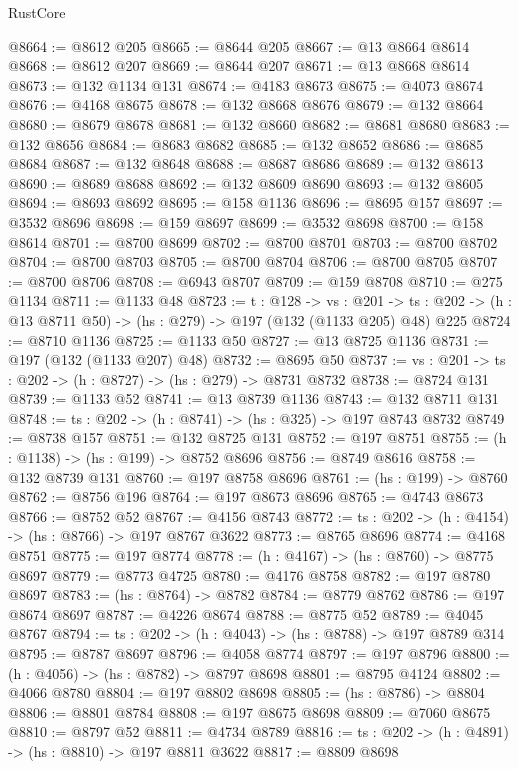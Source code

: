 \begin{lexlean}{RustCore}
\begin{coremodule}
@8664 := @8612 @205
@8665 := @8644 @205
@8667 := @13 @8664 @8614
@8668 := @8612 @207
@8669 := @8644 @207
@8671 := @13 @8668 @8614
@8673 := @132 @1134 @131
@8674 := @4183 @8673
@8675 := @4073 @8674
@8676 := @4168 @8675
@8678 := @132 @8668 @8676
@8679 := @132 @8664
@8680 := @8679 @8678
@8681 := @132 @8660
@8682 := @8681 @8680
@8683 := @132 @8656
@8684 := @8683 @8682
@8685 := @132 @8652
@8686 := @8685 @8684
@8687 := @132 @8648
@8688 := @8687 @8686
@8689 := @132 @8613
@8690 := @8689 @8688
@8692 := @132 @8609 @8690
@8693 := @132 @8605
@8694 := @8693 @8692
@8695 := @158 @1136
@8696 := @8695 @157
@8697 := @3532 @8696
@8698 := @159 @8697
@8699 := @3532 @8698
@8700 := @158 @8614
@8701 := @8700 @8699
@8702 := @8700 @8701
@8703 := @8700 @8702
@8704 := @8700 @8703
@8705 := @8700 @8704
@8706 := @8700 @8705
@8707 := @8700 @8706
@8708 := @6943 @8707
@8709 := @159 @8708
@8710 := @275 @1134
@8711 := @1133 @48
@8723 := {t : @128} ->
  {vs : @201} ->
  {ts : @202} -> (h : @13 @8711 @50) -> (hs : @279) -> @197 (@132 (@1133 @205) @48) @225
@8724 := @8710 @1136
@8725 := @1133 @50
@8727 := @13 @8725 @1136
@8731 := @197 (@132 (@1133 @207) @48)
@8732 := @8695 @50
@8737 := {vs : @201} -> {ts : @202} -> (h : @8727) -> (hs : @279) -> @8731 @8732
@8738 := @8724 @131
@8739 := @1133 @52
@8741 := @13 @8739 @1136
@8743 := @132 @8711 @131
@8748 := {ts : @202} -> (h : @8741) -> (hs : @325) -> @197 @8743 @8732
@8749 := @8738 @157
@8751 := @132 @8725 @131
@8752 := @197 @8751
@8755 := (h : @1138) -> (hs : @199) -> @8752 @8696
@8756 := @8749 @8616
@8758 := @132 @8739 @131
@8760 := @197 @8758 @8696
@8761 := (hs : @199) -> @8760
@8762 := @8756 @196
@8764 := @197 @8673 @8696
@8765 := @4743 @8673
@8766 := @8752 @52
@8767 := @4156 @8743
@8772 := {ts : @202} -> (h : @4154) -> (hs : @8766) -> @197 @8767 @3622
@8773 := @8765 @8696
@8774 := @4168 @8751
@8775 := @197 @8774
@8778 := (h : @4167) -> (hs : @8760) -> @8775 @8697
@8779 := @8773 @4725
@8780 := @4176 @8758
@8782 := @197 @8780 @8697
@8783 := (hs : @8764) -> @8782
@8784 := @8779 @8762
@8786 := @197 @8674 @8697
@8787 := @4226 @8674
@8788 := @8775 @52
@8789 := @4045 @8767
@8794 := {ts : @202} -> (h : @4043) -> (hs : @8788) -> @197 @8789 @314
@8795 := @8787 @8697
@8796 := @4058 @8774
@8797 := @197 @8796
@8800 := (h : @4056) -> (hs : @8782) -> @8797 @8698
@8801 := @8795 @4124
@8802 := @4066 @8780
@8804 := @197 @8802 @8698
@8805 := (hs : @8786) -> @8804
@8806 := @8801 @8784
@8808 := @197 @8675 @8698
@8809 := @7060 @8675
@8810 := @8797 @52
@8811 := @4734 @8789
@8816 := {ts : @202} -> (h : @4891) -> (hs : @8810) -> @197 @8811 @3622
@8817 := @8809 @8698

\end{coremodule}
\end{lexlean}
